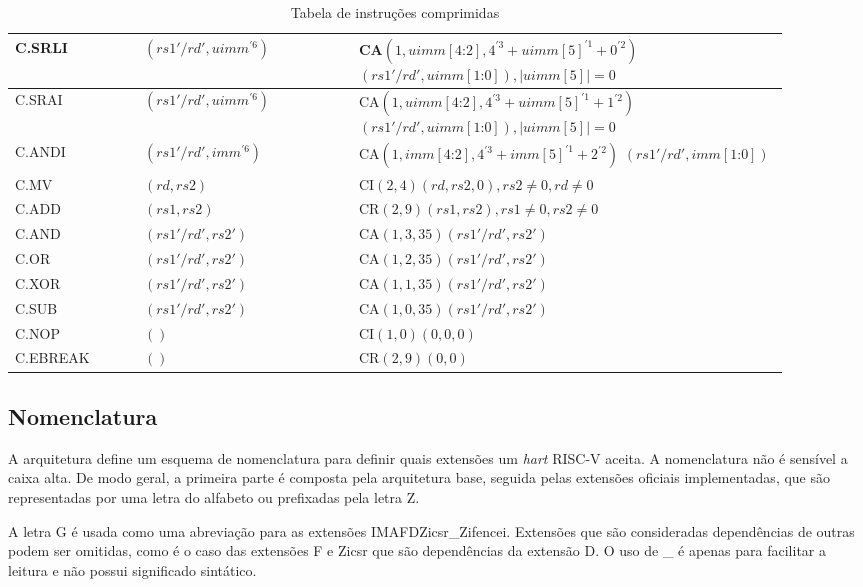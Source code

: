 \begin{table}
\begin{tabular}{ |p{0.15\linewidth}||p{0.25\linewidth}|p{0.5\linewidth}| }
C.SRLI & $(rs1'/rd', uimm^{'6})$ & CA$(1, uimm[4\text{:}2], 4^{'3}+uimm[5]^{'1}+0^{'2})$ $(rs1'/rd', uimm[1\text{:}0]), |uimm[5]| = 0$ \\ \hline
C.SRAI & $(rs1'/rd', uimm^{'6})$ & CA$(1, uimm[4\text{:}2], 4^{'3}+uimm[5]^{'1}+1^{'2})$ $(rs1'/rd', uimm[1\text{:}0]), |uimm[5]| = 0$  \\ \hline
C.ANDI & $(rs1'/rd', imm^{'6})$ & CA$(1, imm[4\text{:}2], 4^{'3}+imm[5]^{'1}+2^{'2})$ $(rs1'/rd', imm[1\text{:}0])$ \\ \hline
C.MV & $(rd, rs2)$ & CI$(2, 4)(rd, rs2, 0), rs2 \neq 0, rd \neq 0$  \\ \hline
C.ADD & $(rs1, rs2)$ & CR$(2, 9)(rs1, rs2), rs1 \neq 0, rs2 \neq 0$ \\ \hline
C.AND & $(rs1'/rd', rs2')$ & CA$(1, 3, 35)(rs1'/rd', rs2')$ \\ \hline
C.OR & $(rs1'/rd', rs2')$ & CA$(1, 2, 35)(rs1'/rd', rs2')$ \\ \hline
C.XOR & $(rs1'/rd', rs2')$ & CA$(1, 1, 35)(rs1'/rd', rs2')$ \\ \hline
C.SUB & $(rs1'/rd', rs2')$ & CA$(1, 0, 35)(rs1'/rd', rs2')$ \\ \hline
C.NOP & $()$ & CI$(1, 0)(0, 0, 0)$ \\ \hline
C.EBREAK & $()$ & CR$(2, 9)(0, 0)$  \\ \hline

    \end{tabular}
  \caption{Tabela de instruções comprimidas \label{tab:c}}
  \end{table}

\subsection{Nomenclatura}
\label{sec:name}

  A arquitetura define um esquema de nomenclatura para definir quais extensões um \emph{hart}
  RISC-V aceita. A nomenclatura não é sensível a caixa alta. De modo geral, a primeira parte é 
  composta pela arquitetura base, seguida pelas extensões oficiais
  implementadas, que são representadas por uma letra do alfabeto ou prefixadas pela letra Z.

  A letra G é usada como uma abreviação para as extensões IMAFDZicsr\_Zifencei. Extensões que 
  são consideradas dependências de outras podem ser omitidas, como é o caso das extensões F e Zicsr
  que são dependências da extensão D. O uso de \_ é apenas para facilitar a leitura
  e não possui significado sintático.

